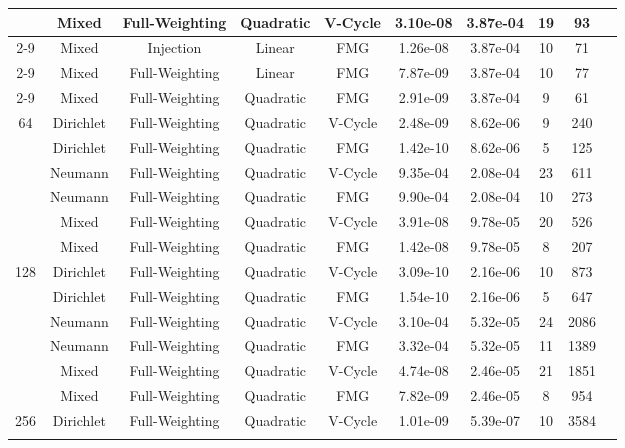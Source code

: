 \documentclass{ctexart}
\begin{document}
\begin{longtable}{cccccccccc}
\multirow{18}{*}{}		& Mixed		& Full-Weighting	& Quadratic	& V-Cycle	& 3.10e-08	& 3.87e-04	& 19	& 93		\\ \cline{2-9}
\multirow{18}{*}{}		& Mixed		& Injection			& Linear	& FMG		& 1.26e-08	& 3.87e-04	& 10	& 71		\\ \cline{2-9}
\multirow{18}{*}{}		& Mixed		& Full-Weighting	& Linear	& FMG		& 7.87e-09	& 3.87e-04	& 10	& 77		\\ \cline{2-9}
\multirow{18}{*}{}		& Mixed		& Full-Weighting	& Quadratic	& FMG		& 2.91e-09	& 3.87e-04	& 9		& 61		\\ \hline
\multirow{6}{*}{64}		& Dirichlet	& Full-Weighting	& Quadratic	& V-Cycle	& 2.48e-09	& 8.62e-06	& 9		& 240		\\ \cline{2-9}
\multirow{6}{*}{}		& Dirichlet	& Full-Weighting	& Quadratic	& FMG		& 1.42e-10	& 8.62e-06	& 5		& 125		\\ \cline{2-9}
\multirow{6}{*}{}		& Neumann	& Full-Weighting	& Quadratic	& V-Cycle	& 9.35e-04	& 2.08e-04	& 23	& 611		\\ \cline{2-9}
\multirow{6}{*}{}		& Neumann	& Full-Weighting	& Quadratic	& FMG		& 9.90e-04	& 2.08e-04	& 10	& 273		\\ \cline{2-9}
\multirow{6}{*}{}		& Mixed		& Full-Weighting	& Quadratic	& V-Cycle	& 3.91e-08	& 9.78e-05	& 20	& 526		\\ \cline{2-9}
\multirow{6}{*}{}		& Mixed		& Full-Weighting	& Quadratic	& FMG		& 1.42e-08	& 9.78e-05	& 8		& 207		\\ \hline
\multirow{6}{*}{128}	& Dirichlet	& Full-Weighting	& Quadratic	& V-Cycle	& 3.09e-10	& 2.16e-06	& 10	& 873		\\ \cline{2-9}
\multirow{6}{*}{}		& Dirichlet	& Full-Weighting	& Quadratic	& FMG		& 1.54e-10	& 2.16e-06	& 5		& 647		\\ \cline{2-9}
\multirow{6}{*}{}		& Neumann	& Full-Weighting	& Quadratic	& V-Cycle	& 3.10e-04	& 5.32e-05	& 24	& 2086		\\ \cline{2-9}
\multirow{6}{*}{}		& Neumann	& Full-Weighting	& Quadratic	& FMG		& 3.32e-04	& 5.32e-05	& 11	& 1389		\\ \cline{2-9}
\multirow{6}{*}{}		& Mixed		& Full-Weighting	& Quadratic	& V-Cycle	& 4.74e-08	& 2.46e-05	& 21	& 1851		\\ \cline{2-9}
\multirow{6}{*}{}		& Mixed		& Full-Weighting	& Quadratic	& FMG		& 7.82e-09	& 2.46e-05	& 8		& 954		\\ \hline
\multirow{6}{*}{256}	& Dirichlet	& Full-Weighting	& Quadratic	& V-Cycle	& 1.01e-09	& 5.39e-07	& 10	& 3584		\\ \cline{2-9}

\end{longtable}
\end{document}

